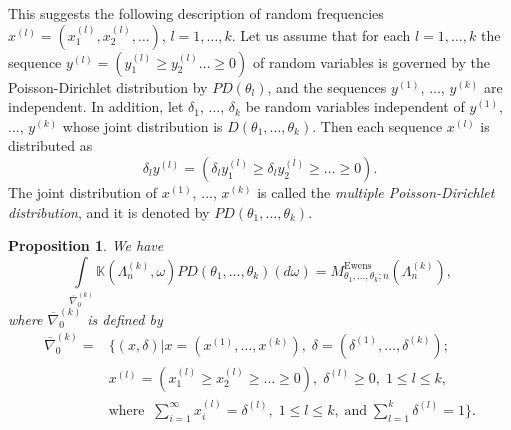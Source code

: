 \documentclass[12pt]{amsart}
\newtheorem{prop}[thm]{Proposition}
\theoremstyle{definition}
\numberwithin{equation}{section}
\DeclareMathOperator{\Ewens}{Ewens}
\begin{document}
This suggests the following description of random frequencies
$x^{(l)}=\left(x_1^{(l)},x_2^{(l)},\ldots\right)$, $l=1,\ldots,k$. Let us assume that for each $l=1,\ldots,k$ the sequence
$y^{(l)}=\left(y_1^{(l)}\geq y_2^{(l)}\ldots\geq 0\right)$ of random variables is governed by the Poisson-Dirichlet distribution by $PD\left(\theta_l\right)$, and the sequences $y^{(1)}$, $\ldots$, $y^{(k)}$ are independent. In addition, let $\delta_1$, $\ldots$, $\delta_k$ be random variables independent of $y^{(1)}$, $\ldots$, $y^{(k)}$ whose joint distribution is $D(\theta_1,\ldots,\theta_k)$. Then each sequence $x^{(l)}$ is distributed as
$$
\delta_ly^{(l)}=\left(\delta_ly_1^{(l)}\geq\delta_ly_2^{(l)}\geq \ldots\geq 0\right).
$$
The joint distribution of $x^{(1)}$, $\ldots$, $x^{(k)}$ is called the \textit{multiple Poisson-Dirichlet distribution}, and it is denoted by $PD\left(\theta_1,\ldots,\theta_k\right)$.
\begin{prop}\label{PropositionMEwenSASIntegral}
We have
\begin{equation}\label{R1.7}
\int\limits_{\overline{\nabla}_0^{(k)}}\mathbb{K}\left(\Lambda_n^{(k)},\omega\right)PD(\theta_1,\ldots,\theta_k)(d\omega)=M_{\theta_1,\ldots,\theta_k;n}^{\Ewens}\left(\Lambda_n^{(k)}\right),
\end{equation}
where $\overline{\nabla}_0^{(k)}$ is defined by
\begin{equation}\label{SetNabla}
\begin{split}
\overline{\nabla}^{(k)}_0=&\biggl\{(x,\delta)\biggr|
x=\left(x^{(1)},\ldots,x^{(k)}\right),\;
\delta=\left(\delta^{(1)},\ldots,\delta^{(k)}\right);\\
&x^{(l)}=\left(x^{(l)}_1\geq x^{(l)}_2\geq\ldots\geq 0\right),\;\delta^{(l)}\geq 0,\;
1\leq l\leq k,\\
&\mbox{where}\;\;\sum\limits_{i=1}^{\infty}x_i^{(l)}=\delta^{(l)},\; 1\leq l\leq k,\;\mbox{and}\;\sum\limits_{l=1}^k\delta^{(l)}=1\biggl\}.
\end{split}
\end{equation}
\end{prop}
\end{document}
